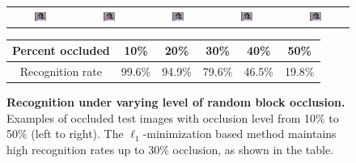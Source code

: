 \renewcommand{\tempwidth}{0.2\textwidth}
\begin{figure}
\centering
\begin{tabular}{@{}c@{}c@{}c@{}c@{}c@{}}
\includegraphics[width=\tempwidth,clip=true]{figures_pami/multipie_occ/occ10.png} &
\includegraphics[width=\tempwidth,clip=true]{figures_pami/multipie_occ/occ20.png} &
\includegraphics[width=\tempwidth,clip=true]{figures_pami/multipie_occ/occ30.png} &
\includegraphics[width=\tempwidth,clip=true]{figures_pami/multipie_occ/occ40.png} &
\includegraphics[width=\tempwidth,clip=true]{figures_pami/multipie_occ/occ50.png}  \\
\end{tabular}
{
\begin{tabular}{|c|c|c|c|c|c| }
\hline
Percent occluded & 10\% & 20\% & 30\% & 40\% & 50\%  \\
\hline
Recognition rate & 99.6\% & 94.9\% & 79.6\% & 46.5\% & 19.8\% \\
\hline
\end{tabular}
}
\caption{\small{\bf Recognition under varying level of random block occlusion.}
Examples of occluded test images with occlusion
level from 10\% to 50\% (left to right). The $\ell_1$-minimization based method maintains high recognition rates up to 30\%
occlusion, as shown in the table.}
\label{fig:multipie-occ-rec}
\end{figure}

